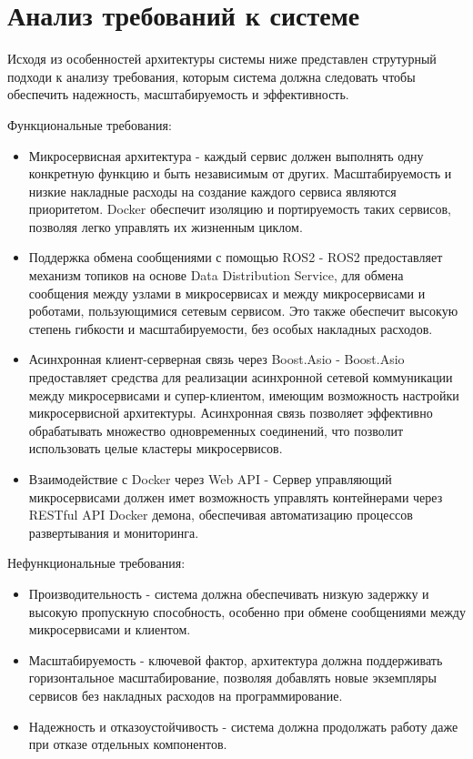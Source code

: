 \documentclass[a4paper, 14pt]{extreport}
\begin{document}
\section{Анализ требований к системе}
\par Исходя из особенностей архитектуры системы ниже представлен струтурный подходи к анализу требования, которым система должна следовать 
чтобы обеспечить надежность, масштабируемость и эффективность.
\par\noindent Функциональные требования:
\begin{itemize}
        \item Микросервисная архитектура - каждый сервис должен выполнять одну конкретную функцию и быть независимым от других.
              Масштабируемость и низкие накладные расходы на создание каждого сервиса являются приоритетом. Docker обеспечит изоляцию и 
              портируемость таких сервисов, позволяя легко управлять их жизненным циклом.
        \item Поддержка обмена сообщениями с помощью ROS2 - ROS2 предоставляет механизм топиков на основе Data Distribution Service, для
              обмена сообщения между узлами в микросервисах и между микросервисами и роботами, пользующимися сетевым сервисом. Это также 
              обеспечит высокую степень гибкости и масштабируемости, без особых накладных расходов.
        \item Асинхронная клиент-серверная связь через Boost.Asio - Boost.Asio предоставляет средства для реализации асинхронной сетевой 
              коммуникации между микросервисами и супер-клиентом, имеющим возможность настройки микросервисной архитектуры. Асинхронная 
              связь позволяет эффективно обрабатывать множество одновременных соединений, что позволит использовать целые кластеры 
              микросервисов.
        \item Взаимодействие с Docker через Web API\cite{dockerApi} - Сервер управляющий микросервисами должен имет возможность управлять контейнерами 
              через RESTful API Docker демона, обеспечивая автоматизацию процессов развертывания и мониторинга.
\end{itemize}
\par\noindent Нефункциональные требования:
\begin{itemize}
        \item Производительность - система должна обеспечивать низкую задержку и высокую пропускную способность, особенно при обмене 
              сообщениями между микросервисами и клиентом.
        \item Масштабируемость - ключевой фактор, архитектура должна поддерживать горизонтальное масштабирование, позволяя добавлять
              новые экземпляры сервисов без накладных расходов на программирование.
        \item Надежность и отказоустойчивость - система должна продолжать работу даже при отказе отдельных компонентов.
\end{itemize}
\end{document}

